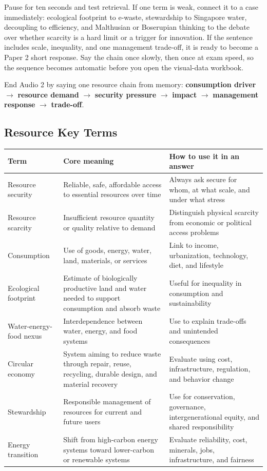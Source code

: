 \documentclass[11pt,a4paper]{article}
\newcommand{\term}[1]{\textcolor{HeadingBlue}{\textbf{#1}}}
\begin{document}
Pause for ten seconds and test retrieval. If one term is weak, connect it to a
case immediately: ecological footprint to e-waste, stewardship to Singapore
water, decoupling to efficiency, and Malthusian or Boserupian thinking to the
debate over whether scarcity is a hard limit or a trigger for innovation.
If the sentence includes scale, inequality, and one management trade-off, it is
ready to become a Paper 2 short response.
Say the chain once slowly, then once at exam speed, so the sequence becomes
automatic before you open the visual-data workbook.

End Audio 2 by saying one resource chain from memory:
\term{consumption driver} $\rightarrow$ \term{resource demand} $\rightarrow$
\term{security pressure} $\rightarrow$ \term{impact} $\rightarrow$
\term{management response} $\rightarrow$ \term{trade-off}.

\subsection{Resource Key Terms}

\begin{tabularx}{\textwidth}{L{0.24\textwidth}Y Y}
\toprule
\textbf{Term} & \textbf{Core meaning} & \textbf{How to use it in an answer} \\
\midrule
Resource security & Reliable, safe, affordable access to essential resources
over time & Always ask secure for whom, at what scale, and under what stress \\
Resource scarcity & Insufficient resource quantity or quality relative to
demand & Distinguish physical scarcity from economic or political access
problems \\
Consumption & Use of goods, energy, water, land, materials, or services & Link
to income, urbanization, technology, diet, and lifestyle \\
Ecological footprint & Estimate of biologically productive land and water
needed to support consumption and absorb waste & Useful for inequality in
consumption and sustainability \\
Water-energy-food nexus & Interdependence between water, energy, and food
systems & Use to explain trade-offs and unintended consequences \\
Circular economy & System aiming to reduce waste through repair, reuse,
recycling, durable design, and material recovery & Evaluate using cost,
infrastructure, regulation, and behavior change \\
Stewardship & Responsible management of resources for current and future users
& Use for conservation, governance, intergenerational equity, and shared
responsibility \\
Energy transition & Shift from high-carbon energy systems toward lower-carbon
or renewable systems & Evaluate reliability, cost, minerals, jobs,
infrastructure, and fairness \\
\bottomrule
\end{tabularx}
\end{document}
